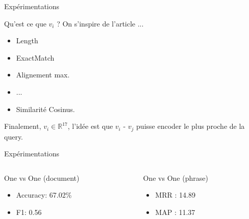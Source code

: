 \documentclass{beamer}
\begin{document}
\begin{frame}{Expérimentations}
    \begin{block}{Qu'est ce que $v_i$ ?}
        On s'inspire de l'article ...
        \begin{itemize}
            \item Length
            \item ExactMatch
            \item Alignement max.
            \item ...
            \item Similarité Cosinus.
        \end{itemize}
        
        Finalement, $v_i \in \mathbb{R}^{17}$, l'idée est que $v_i$ - $v_j$ puisse encoder le plus proche de la query.
    \end{block}
\end{frame}

\begin{frame}{Expérimentations}
    \begin{columns}
        
        \begin{column}{0.48\textwidth}
            \begin{block}{One vs One (document)}
                \begin{itemize}
                    \item Accuracy: 67.02\%
                    \item F1: 0.56
                \end{itemize}
            \end{block}
        \end{column}
        
        \begin{column}{0.48\textwidth}
            \begin{block}{One vs One (phrase)}
                \begin{itemize}
                    \item MRR : 14.89
                    \item MAP : 11.37
                \end{itemize}
            \end{block}
        \end{column}
        
    \end{columns}
\end{frame}
\end{document}
